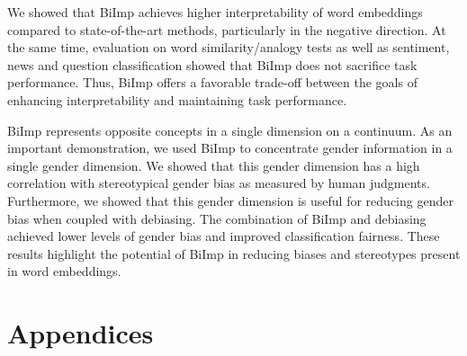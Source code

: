 \documentclass[11pt,a4paper]{article}
\def\proposedmethod{BiImp}
\begin{document}
We showed that  \proposedmethod{}
achieves higher interpretability of word embeddings compared to
state-of-the-art methods, particularly in the negative
direction. At the same time, evaluation on word
similarity/analogy tests as well as sentiment, news and
question classification  showed that \proposedmethod{} does
not sacrifice task performance.
Thus, \proposedmethod{} offers a favorable
trade-off between the goals of enhancing
interpretability and maintaining task performance.




\proposedmethod{} represents opposite concepts in a single
dimension on a continuum. As an important demonstration, we
used \proposedmethod{} to concentrate gender information in
a single gender dimension.  We showed that this gender
dimension has a high correlation with stereotypical gender
bias as measured by human judgments. Furthermore, we showed
that this gender dimension is useful for reducing gender
bias when coupled with debiasing.  The combination of
\proposedmethod{} and debiasing achieved lower levels of
gender bias and improved classification fairness. These
results highlight the potential of \proposedmethod{} in
reducing biases and stereotypes present in word embeddings.






\clearpage

\appendix

\section{Appendices}
\end{document}
